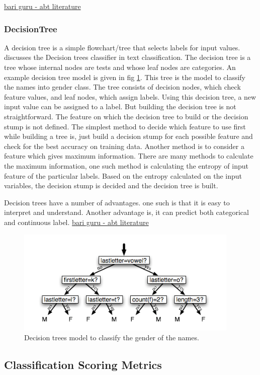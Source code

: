 \underline{bari guru - abt literature }

\subsubsection{DecisionTree}
A decision tree is a simple flowchart/tree that selects labels for input values. \cite{BirdKleinLoper09} discusses the Decision trees classifier in text classification. The decision tree is a tree whose internal nodes are tests and whose leaf nodes are categories. An example decision tree model is given in fig \ref{fig:Decision_tree}. This tree is the model to classify the names into gender class. The tree consists of decision nodes, which check feature values, and leaf nodes, which assign labels. Using this decision tree, a new input value can be assigned to a label. But building the decision tree is not straightforward. The feature on which the decision tree to build or the decision stump is not defined. The simplest method to decide which feature to use first while building a tree is, just build a decision stump for each possible feature and check for the best accuracy on training data. Another method is to consider a feature which gives maximum information. There are many methods to calculate the maximum information, one such method is calculating the entropy of input feature of the particular labels. Based on the entropy calculated on the input variables, the decision stump is decided and the decision tree is built.

Decision trees have a number of advantages. one such is that it is easy to interpret and understand. Another advantage is, it can predict both categorical and continuous label. \underline{bari guru - abt literature }



\begin{figure}
    \centering
    \includegraphics[width=0.5\linewidth]{images/Decisiontrees.png}
    \caption{Decision trees model to classify the gender of the names.}
    \label{fig:Decision_tree}
\end{figure}

\subsection{Classification Scoring Metrics} \label{scoringmetrics} \label{metricsofclassification}

